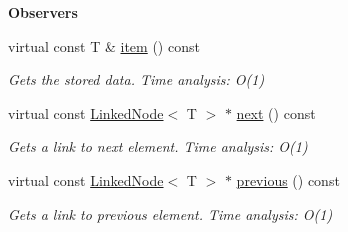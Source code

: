 \begin{Indent}{\bf Observers}\par
\begin{DoxyCompactItemize}
\item 
virtual const T \& \hyperlink{classedi_1_1LinkedNode_aac54788675e672b5a9ae85a83890dda8}{item} () const 
\begin{DoxyCompactList}\small\item\em Gets the stored data. Time analysis\+: O(1) \end{DoxyCompactList}\item 
virtual const \hyperlink{classedi_1_1LinkedNode}{Linked\+Node}$<$ T $>$ $\ast$ \hyperlink{classedi_1_1LinkedNode_a86170b1d8ac57d1cf1833582ee20d430}{next} () const 
\begin{DoxyCompactList}\small\item\em Gets a link to next element. Time analysis\+: O(1) \end{DoxyCompactList}\item 
virtual const \hyperlink{classedi_1_1LinkedNode}{Linked\+Node}$<$ T $>$ $\ast$ \hyperlink{classedi_1_1LinkedNode_aa3dff6aa75b3f2a61d2f3f63a7e56298}{previous} () const 
\begin{DoxyCompactList}\small\item\em Gets a link to previous element. Time analysis\+: O(1) \end{DoxyCompactList}\end{DoxyCompactItemize}
\end{Indent}
